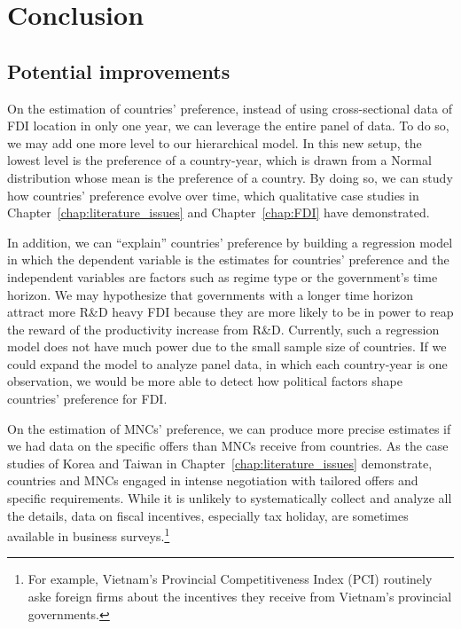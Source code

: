 \chapter{Conclusion}
\label{chap:conclusion}

\section{Potential improvements}

On the estimation of countries' preference, instead of using cross-sectional
data of FDI location in only one year, we can leverage the entire panel of data.
To do so, we may add one more level to our hierarchical model. In this new
setup, the lowest level is the preference of a country-year, which is drawn from
a Normal distribution whose mean is the preference of a country. By doing so, we
can study how countries' preference evolve over time, which qualitative case
studies in Chapter~\ref{chap:literature_issues} and Chapter~\ref{chap:FDI} have
demonstrated.

In addition, we can ``explain'' countries' preference by building a regression
model in which the dependent variable is the estimates for countries' preference
and the independent variables are factors such as regime type or the
government's time horizon. We may hypothesize that governments with a longer
time horizon attract more R\&D heavy FDI because they are more likely to be in
power to reap the reward of the productivity increase from R\&D. Currently, such
a regression model does not have much power due to the small sample size of
countries. If we could expand the model to analyze panel data, in which each
country-year is one observation, we would be more able to detect how political
factors shape countries' preference for FDI.

On the estimation of MNCs' preference, we can produce more precise estimates if
we had data on the specific offers than MNCs receive from countries. As the case
studies of Korea and Taiwan in Chapter~\ref{chap:literature_issues} demonstrate,
countries and MNCs engaged in intense negotiation with tailored offers and
specific requirements. While it is unlikely to systematically collect and
analyze all the details, data on fiscal incentives, especially tax holiday, are
sometimes available in business surveys.\footnote{For example, Vietnam's
  Provincial Competitiveness Index (PCI) routinely aske foreign firms about the
  incentives they receive from Vietnam's provincial governments.}

